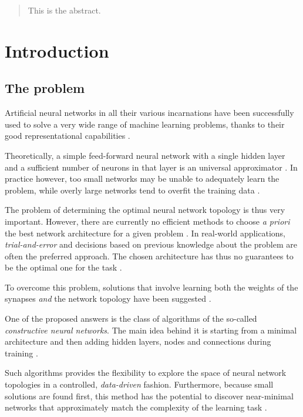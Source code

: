 \documentclass[11pt,a4paper]{report}
\begin{document}
	
	
	\begin{abstract}
		This is the abstract.
	\end{abstract}
	
	\tableofcontents

	\printnomenclature
	\listoffigures
	\listoftables
	
	\chapter{Introduction}
		\section{The problem}
		Artificial neural networks in all their various incarnations have been successfully used to solve a very wide range of machine learning problems, thanks to their good representational capabilities \cite{sharma2010constructive}.
		
		Theoretically, a simple feed-forward neural network with a single hidden layer and a sufficient number of neurons in that layer is an universal approximator \cite{hornik1989multilayer}. In practice however, too small networks may be unable to adequately learn the problem, while overly large networks tend to overfit the training data \cite{parekh2000constructive}.
		
		The problem of determining the optimal neural network topology is thus very important. However, there are currently no efficient methods to choose \emph{a priori} the best network architecture for a given problem \cite{parekh2000constructive}. In real-world applications, \emph{trial-and-error} and decisions based on previous knowledge about the problem are often the preferred approach. The chosen architecture has thus no guarantees to be the optimal one for the task \cite{sharma2010constructive}.
		
		To overcome this problem, solutions that involve learning both the weights of the synapses \emph{and} the network topology have been suggested \cite{parekh2000constructive}.
		
		One of the proposed answers is the class of algorithms of the so-called \emph{constructive neural networks}. The main idea behind it is starting from a minimal architecture and then adding hidden layers, nodes and connections during training \cite{sharma2010constructive}.
		
		Such algorithms provides the flexibility to explore the space of neural network topologies in a controlled, \emph{data-driven} fashion. Furthermore, because small solutions are found first, this method has the potential to discover near-minimal networks that approximately match the complexity of the learning task \cite{parekh2000constructive}.
		
\end{document}
